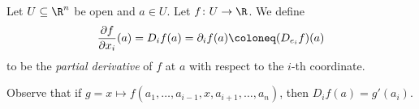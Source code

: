 \begin{definition} \label{def:pdv}
    Let $U \subseteq \R^n$ be open and $a \in U$.
    Let $f\colon U \to \R$.
    We define \[
        \pdv{f}{x_i}(a) = D_i f(a) = \partial_i f(a) \coloneq (D_{e_i} f)(a)
    \] to be the \emph{partial derivative} of $f$ at $a$
    with respect to the $i$-th coordinate.
\end{definition}
Observe that if $g = x \mapsto f(a_1,\dots,a_{i-1},x,a_{i+1},\dots,a_n)$,
then $D_i f(a) = g'(a_i).$

